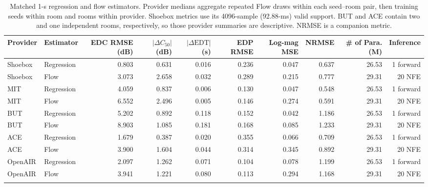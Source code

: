 \begin{table}[t]
\centering\scriptsize
\caption{Matched 1-s regression and flow estimators. Provider medians aggregate repeated Flow draws within each seed--room pair,
then training seeds within room and rooms within provider. Shoebox
metrics use its 4096-sample (92.88-ms) valid support. BUT and ACE contain two
and one independent rooms, respectively, so those provider summaries are
descriptive. NRMSE is a companion metric.}
\label{tab:main}
\begin{tabular}{llrrrrrrrr}
\toprule
Provider & Estimator & EDC RMSE (dB) & $|\Delta C_{50}|$ (dB) & $|\Delta\mathrm{EDT}|$ (s) & EDP RMSE & Log-mag MSE & NRMSE & \# of Para. (M) & Inference \\
\midrule
Shoebox & Regression & 0.803 & 0.631 & 0.016 & 0.236 & 0.047 & 0.637 & 26.53 & 1 forward \\
Shoebox & Flow & 3.073 & 2.658 & 0.032 & 0.289 & 0.215 & 0.777 & 29.31 & 20 NFE \\
\addlinespace
MIT & Regression & 4.059 & 0.837 & 0.006 & 0.130 & 0.047 & 0.548 & 26.53 & 1 forward \\
MIT & Flow & 6.552 & 2.496 & 0.005 & 0.146 & 0.274 & 0.591 & 29.31 & 20 NFE \\
\addlinespace
BUT & Regression & 5.202 & 0.892 & 0.118 & 0.152 & 0.042 & 1.186 & 26.53 & 1 forward \\
BUT & Flow & 8.903 & 1.085 & 0.181 & 0.168 & 0.085 & 1.233 & 29.31 & 20 NFE \\
\addlinespace
ACE & Regression & 1.679 & 0.387 & 0.020 & 0.355 & 0.066 & 0.709 & 26.53 & 1 forward \\
ACE & Flow & 3.900 & 1.604 & 0.044 & 0.314 & 0.345 & 0.892 & 29.31 & 20 NFE \\
\addlinespace
OpenAIR & Regression & 2.097 & 1.262 & 0.071 & 0.104 & 0.078 & 1.199 & 26.53 & 1 forward \\
OpenAIR & Flow & 3.941 & 1.221 & 0.080 & 0.113 & 0.294 & 1.168 & 29.31 & 20 NFE \\
\addlinespace
\bottomrule
\end{tabular}
\end{table}


